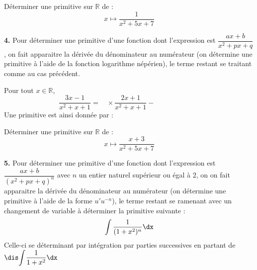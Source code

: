 \documentclass[a4paper,10pt]{report}
\newcommand{\Int}[2]{\ensuremath{\mathchoice%
	{{\displaystyle\int_{#1}^{#2}}}
	{{\displaystyle\int_{#1}^{#2}}}
	{\int_{#1}^{#2}}
	{\int_{#1}^{#2}}
	}}
\begin{document}
\begin{exa} Déterminer une primitive sur $\mathbb{R}$ de :
$$ x \mapsto \frac{1}{x^2+5x+7}$$
\end{exa}


\noindent \textbf{4.} Pour déterminer une primitive d'une fonction dont l'expression est $\dfrac{ax+b}{x^2+px+q}$, on fait apparaitre la dérivée du dénominateur au numérateur (on détermine une primitive à l'aide de la fonction logarithme népérien), le terme restant se traitant comme au cas précédent.

\medskip

\begin{ex} Pour tout $x \in \mathbb{R}$,
$$ \frac{3x-1}{x^2+x+1} = \; \phantom{\frac{3}{2}} \times \frac{2x+1}{x^2+x+1} - \phantom{\frac{5}{2} \times \frac{1}{x^2+x+1}}$$
Une primitive est ainsi donnée par :

\vspace{3cm}
\end{ex}

\begin{exa} Déterminer une primitive sur $\mathbb{R}$ de :
$$ x \mapsto \frac{x+3}{x^2+5x+7}$$
\end{exa}

\noindent \textbf{5.} Pour déterminer une primitive d'une fonction dont l'expression est $\dfrac{ax+b}{(x^2+px+q)^n}$ avec $n$ un entier naturel supérieur ou égal à $2$, on on fait apparaitre la dérivée du dénominateur au numérateur (on détermine une primitive à l'aide de la forme $u'u^{-n}$), le terme restant se ramenant avec un changement de variable à déterminer la primitive suivante :
$$ \int \frac{1}{(1+x^2)^n} \dx$$
Celle-ci se déterminant par intégration par parties successives en partant de $\dis \Int{}{} \dfrac{1}{1+x^2} \dx$
\end{document}
